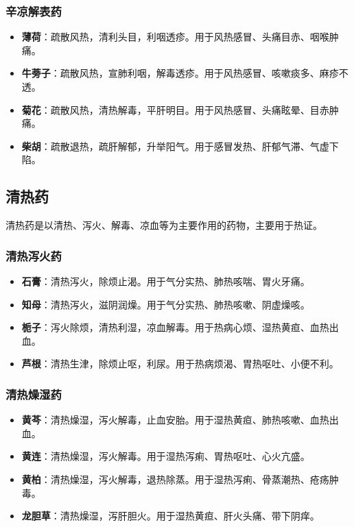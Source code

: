 \documentclass[12pt,UTF8]{ctexbook}
\begin{document}
\subsubsection{辛凉解表药}

\begin{itemize}
\item \textbf{薄荷}：疏散风热，清利头目，利咽透疹。用于风热感冒、头痛目赤、咽喉肿痛。
\item \textbf{牛蒡子}：疏散风热，宣肺利咽，解毒透疹。用于风热感冒、咳嗽痰多、麻疹不透。
\item \textbf{菊花}：疏散风热，清热解毒，平肝明目。用于风热感冒、头痛眩晕、目赤肿痛。
\item \textbf{柴胡}：疏散退热，疏肝解郁，升举阳气。用于感冒发热、肝郁气滞、气虚下陷。
\end{itemize}

\subsection{清热药}

清热药是以清热、泻火、解毒、凉血等为主要作用的药物，主要用于热证。

\subsubsection{清热泻火药}

\begin{itemize}
\item \textbf{石膏}：清热泻火，除烦止渴。用于气分实热、肺热咳喘、胃火牙痛。
\item \textbf{知母}：清热泻火，滋阴润燥。用于气分实热、肺热咳嗽、阴虚燥咳。
\item \textbf{栀子}：泻火除烦，清热利湿，凉血解毒。用于热病心烦、湿热黄疸、血热出血。
\item \textbf{芦根}：清热生津，除烦止呕，利尿。用于热病烦渴、胃热呕吐、小便不利。
\end{itemize}

\subsubsection{清热燥湿药}

\begin{itemize}
\item \textbf{黄芩}：清热燥湿，泻火解毒，止血安胎。用于湿热黄疸、肺热咳嗽、血热出血。
\item \textbf{黄连}：清热燥湿，泻火解毒。用于湿热泻痢、胃热呕吐、心火亢盛。
\item \textbf{黄柏}：清热燥湿，泻火解毒，退热除蒸。用于湿热泻痢、骨蒸潮热、疮疡肿毒。
\item \textbf{龙胆草}：清热燥湿，泻肝胆火。用于湿热黄疸、肝火头痛、带下阴痒。
\end{itemize}
\end{document}
